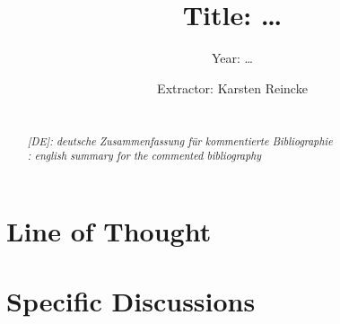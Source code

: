 \documentclass[
  DIV=calc,
  BCOR=5mm,
  11pt,
  headings=small,
  oneside,
  abstract=true,
  toc=bib,
  ngerman,english]{scrartcl}
\begin{document}

\titlehead{Excerpt (english configuration)}
\subject{Author(s): \ldots}
\title{Title: \ldots}
\subtitle{Year: \ldots }
\author{Extractor: Karsten Reincke}

\maketitle

\begin{abstract}
\noindent
\cite[(ist:)][219 - 221]{Allen2001a} \\
\noindent \itshape
[DE]: deutsche Zusammenfassung für kommentierte Bibliographie \\
\noindent
[EN]: english summary for the commented bibliography
\end{abstract}
\footnotesize
\normalsize

\section{Line of Thought}

\section{Specific Discussions}

\small




\printnomenclature


\end{document}
